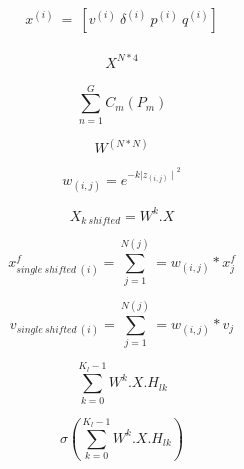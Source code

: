 
\usepackage{amsmath}

\[
 \begin{array}{l}
x^{( i)} \ =\ \left[ v^{( i)} \ \delta ^{( i)} \ p^{( i)} \ q^{( i)}\right]
\end{array}
\]

\[
 \begin{array}{l}
 X^{N*4}
\end{array}
\]


\[ \sum_{n=1}^{G} C_{m}( P_{m}) \]

\[W^{(N*N)}\]

\[w_{(i,j)} = e^{-k{\mid z_{(i,j)} \mid}^2}\]

\[X_{k\ shifted} = W^{k} . X\]

\[x_{single\ shifted\ (i)}^f = \sum_{j=1}^{N(j)} = w_{(i,j)} * x_j^f\]

\[v_{single\ shifted\ (i)} = \sum_{j=1}^{N(j)} = w_{(i,j)} * v_j\]

\[\sum_{k=0}^{K_l-1} W^{k} . X . H_{lk}\]

\[ \sigma( \sum_{k=0}^{K_l-1} W^{k} . X . H_{lk}) \]


